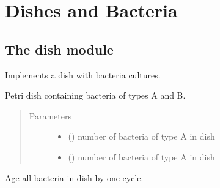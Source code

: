 \documentclass[a4paper,10pt,english]{sphinxmanual}
\begin{document}
\chapter{Dishes and Bacteria}
\label{\detokenize{dish_and_bacteria:dishes-and-bacteria}}\label{\detokenize{dish_and_bacteria::doc}}

\section{The dish module}
\label{\detokenize{dish_and_bacteria:module-biolab.dish}}\label{\detokenize{dish_and_bacteria:the-dish-module}}
Implements a dish with bacteria cultures.

\begin{fulllineitems}
\label{\detokenize{dish_and_bacteria:biolab.dish.Dish}}
Petri dish containing bacteria of types A and B.
\begin{quote}\begin{description}
\item[{Parameters}] \leavevmode\begin{itemize}
\item {} 
 () \textendash{} number of bacteria of type A in dish

\item {} 
 () \textendash{} number of bacteria of type A in dish

\end{itemize}

\end{description}\end{quote}

\begin{fulllineitems}
\label{\detokenize{dish_and_bacteria:biolab.dish.Dish.aging}}
Age all bacteria in dish by one cycle.

\end{fulllineitems}



\end{fulllineitems}
\end{document}
